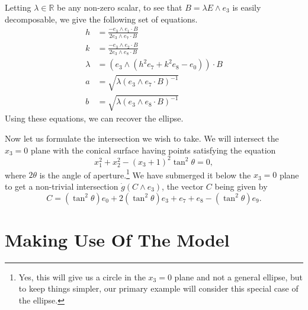 \documentclass{birkjour}
\theoremstyle{definition}
\theoremstyle{remark}
\numberwithin{equation}{section}
\newcommand{\R}{\mathbb{R}}
\newcommand{\gd}{\dot{g}}
\begin{document}
Letting $\lambda\in\R$ be any non-zero scalar, to see that
$B=\lambda E\wedge e_3$ is easily decomposable, we give the following set of
equations.
\begin{align}
h &= \frac{-e_3\wedge e_1\cdot B}{2e_3\wedge e_7\cdot B}\label{equ_decompose_first} \\
k &= \frac{-e_3\wedge e_2\cdot B}{2e_3\wedge e_8\cdot B} \\
\lambda &= (e_3\wedge(h^2e_7+k^2e_8-e_0))\cdot B \\
a &= \sqrt{\lambda(e_3\wedge e_7\cdot B)^{-1}} \\
b &= \sqrt{\lambda(e_3\wedge e_8\cdot B)^{-1}}\label{equ_decompose_last}
\end{align}
Using these equations, we can recover the ellipse.

Now let us formulate the intersection we wish to take.  We will
intersect the $x_3=0$ plane with the conical surface having points satisfying the equation
\begin{equation}\label{equ_conical_surface}
x_1^2+x_2^2 - (x_3+1)^2\tan^2\theta = 0,
\end{equation}
where $2\theta$ is the angle of aperture.\footnote{Yes, this will give
us a circle in the $x_3=0$ plane and not a general ellipse, but to keep things
simpler, our primary example will consider this special case of the ellipse.}  We have submerged it
below the $x_3=0$ plane to get a non-trivial intersection $\gd(C\wedge e_3)$,
the vector $C$ being given by
\begin{equation*}
C = (\tan^2\theta)e_0 + 2(\tan^2\theta)e_3 + e_7 + e_8 - (\tan^2\theta)e_9.
\end{equation*}

\section{Making Use Of The Model}
\end{document}
